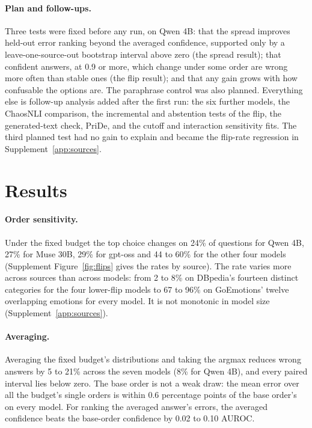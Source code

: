 \documentclass[10pt,twocolumn]{article}
\begin{document}
\paragraph{Plan and follow-ups.} Three tests were fixed before any run, on Qwen 4B: that the spread improves held-out error ranking beyond the averaged confidence, supported only by a leave-one-source-out bootstrap interval above zero (the spread result); that confident answers, at 0.9 or more, which change under some order are wrong more often than stable ones (the flip result); and that any gain grows with how confusable the options are. The paraphrase control was also planned. Everything else is follow-up analysis added after the first run: the six further models, the ChaosNLI comparison, the incremental and abstention tests of the flip, the generated-text check, PriDe, and the cutoff and interaction sensitivity fits. The third planned test had no gain to explain and became the flip-rate regression in Supplement~\ref{app:sources}.

\section{Results}

\paragraph{Order sensitivity.} Under the fixed budget the top choice changes on 24\% of questions for Qwen 4B, 27\% for Muse 30B, 29\% for gpt-oss and 44 to 60\% for the other four models (Supplement Figure~\ref{fig:flips} gives the rates by source). The rate varies more across sources than across models: from 2 to 8\% on DBpedia's fourteen distinct categories for the four lower-flip models to 67 to 96\% on GoEmotions' twelve overlapping emotions for every model. It is not monotonic in model size (Supplement~\ref{app:sources}).

\paragraph{Averaging.} Averaging the fixed budget's distributions and taking the argmax reduces wrong answers by 5 to 21\% across the seven models (8\% for Qwen 4B), and every paired interval lies below zero. The base order is not a weak draw: the mean error over all the budget's single orders is within 0.6 percentage points of the base order's on every model. For ranking the averaged answer's errors, the averaged confidence beats the base-order confidence by 0.02 to 0.10 AUROC.
\end{document}

